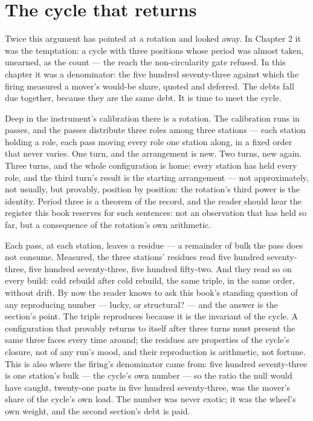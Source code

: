 \section{The cycle that returns}

Twice this argument has pointed at a rotation and looked away. In Chapter 2 it was
the temptation: a cycle with three positions whose period was almost taken, unearned,
as the count --- the reach the non-circularity gate refused. In this chapter it was a
denominator: the five hundred seventy-three against which the firing measured a
mover's would-be share, quoted and deferred. The debts fall due together, because
they are the same debt. It is time to meet the cycle.

Deep in the instrument's calibration there is a rotation. The calibration runs in
passes, and the passes distribute three roles among three stations --- each station
holding a role, each pass moving every role one station along, in a fixed order that
never varies. One turn, and the arrangement is new. Two turns, new again. Three
turns, and the whole configuration is home: every station has held every role, and
the third turn's result is the starting arrangement --- not approximately, not
usually, but provably, position by position: the rotation's third power is the
identity. Period three is a theorem of the record, and the reader should hear the
register this book reserves for such sentences: not an observation that has held so
far, but a consequence of the rotation's own arithmetic.

Each pass, at each station, leaves a residue --- a remainder of bulk the pass does
not consume. Measured, the three stations' residues read five hundred seventy-three,
five hundred seventy-three, five hundred fifty-two. And they read so on every build:
cold rebuild after cold rebuild, the same triple, in the same order, without drift.
By now the reader knows to ask this book's standing question of any reproducing
number --- lucky, or structural? --- and the answer is the section's point. The
triple reproduces because it is the invariant of the cycle. A configuration that
provably returns to itself after three turns must present the same three faces every
time around; the residues are properties of the cycle's closure, not of any run's
mood, and their reproduction is arithmetic, not fortune. This is also where the
firing's denominator came from: five hundred seventy-three is one station's bulk ---
the cycle's own number --- so the ratio the null would have caught, twenty-one parts
in five hundred seventy-three, was the mover's share of the cycle's own load. The
number was never exotic; it was the wheel's own weight, and the second section's
debt is paid.

